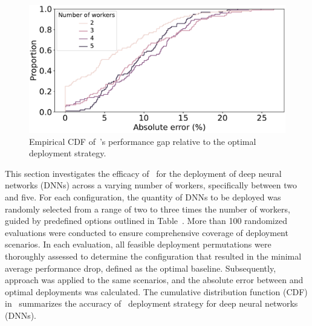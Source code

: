 \begin{figure}[t!]
	\centering
	\includegraphics[width=\linewidth]{chapters/roomie/images/performance_gap_per_worker.pdf}
	\caption{Empirical CDF of~\roomie's performance gap relative to the optimal deployment strategy.}
	\label{fig:performance_gap}
\end{figure}

This section investigates the efficacy of~\roomie{} for the deployment of deep neural networks (DNNs) across a varying number of workers, specifically between two and five. For each configuration, the quantity of DNNs to be deployed was randomly selected from a range of two to three times the number of workers, guided by predefined options outlined in Table~. More than 100 randomized evaluations were conducted to ensure comprehensive coverage of deployment scenarios. In each evaluation, all feasible deployment permutations were thoroughly assessed to determine the configuration that resulted in the minimal average performance drop, defined as the optimal baseline. Subsequently, \roomie{} approach was applied to the same scenarios, and the absolute error between \roomie{} and optimal deployments was calculated. The cumulative distribution function (CDF) in~ summarizes the accuracy of~\roomie{} deployment strategy for deep neural networks (DNNs).


